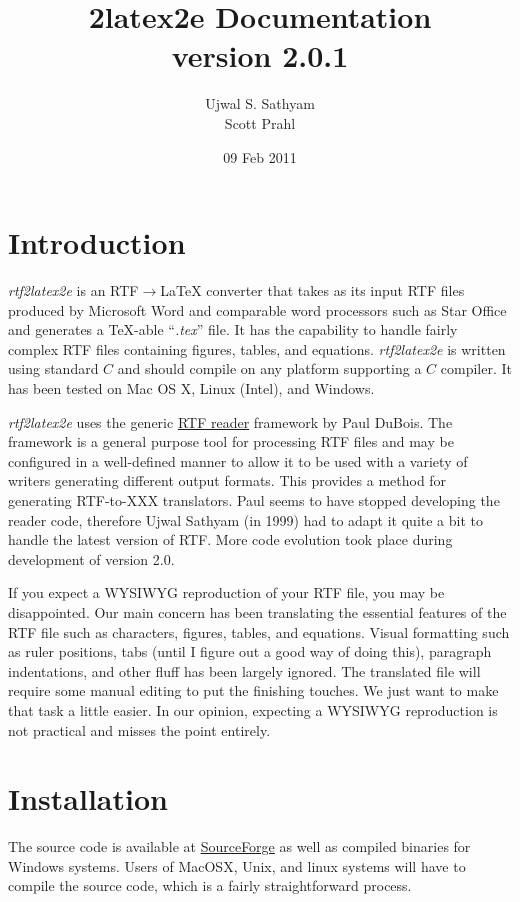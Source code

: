 \documentclass{article}
\title{\rtf2latex2e Documentation\\
version 2.0.1}
\author{Ujwal S. Sathyam\\ Scott Prahl}
\date{09 Feb 2011}
\def\rtf2latex2e{{\it rtf2latex2e}}
\begin{document}
 
\maketitle

\section{Introduction 
\label{intro}} \rtf2latex2e is an RTF$\rightarrow${\LaTeX}
converter that takes as its input RTF files produced by Microsoft Word
and comparable word processors such as Star Office and generates a
\TeX-able ``{\it .tex}'' file.  It has the capability to handle fairly
complex RTF files containing figures, tables, and equations.  
\rtf2latex2e is written using standard $C$ and
should compile on any platform supporting a $C$ compiler.  It has
been tested on Mac OS X, Linux (Intel), and Windows.

\rtf2latex2e uses the generic
\href{http://www.snake.net/software/RTF/}{RTF reader}
framework by Paul DuBois.  The framework is a general purpose tool for
processing RTF files and may be configured in a well-defined manner to
allow it to be used with a variety of writers generating different
output formats.  This provides a method for generating RTF-to-XXX
translators.  Paul seems to have stopped developing the
reader code, therefore Ujwal Sathyam (in 1999) had to adapt it quite a bit to handle the
latest version of RTF.  More code evolution took place during
development of version 2.0.

If you expect a WYSIWYG reproduction of your RTF file, you may be
disappointed.  Our main concern has been translating the essential
features of the RTF file such as characters, figures, tables, and
equations.  Visual formatting
such as ruler positions, tabs (until I figure out a good way of doing
this), paragraph indentations, and other fluff has been largely ignored.  
The translated {\LaTeXe} file will require some manual editing to put the
finishing touches.  We just want to make that task a little easier.  In
our opinion, expecting a WYSIWYG reproduction is not practical and
misses the point entirely.

\section{Installation}
The source code is available at \href{http://sourceforge.net/projects/rtf2latex2e/}{SourceForge}
as well as compiled binaries for Windows systems. 
Users of MacOSX, Unix, and linux systems will have to compile the source code,
which is a fairly straightforward process.
\end{document}
